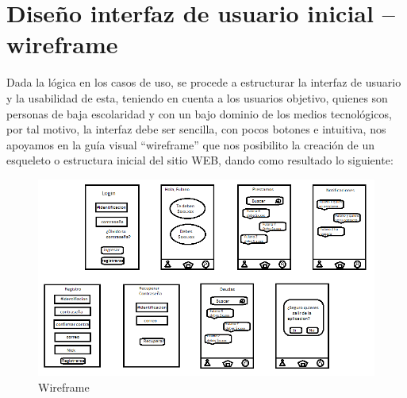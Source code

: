 \section{Diseño interfaz de usuario inicial – wireframe}

{Dada la lógica en los casos de uso, se procede a estructurar la interfaz de usuario y la usabilidad de esta, teniendo en cuenta a los usuarios objetivo, quienes son personas de baja escolaridad y con un bajo dominio de los medios tecnológicos, por tal motivo, la interfaz debe ser sencilla, con pocos botones e intuitiva, nos apoyamos en la guía visual “wireframe” que nos posibilito la creación de un esqueleto o estructura inicial del sitio WEB, dando como resultado lo siguiente:

\begin{figure}[H]
	\centering
	\includegraphics[width=1\linewidth]{development/wireframe.png}
	\caption{Wireframe}
\end{figure}
}